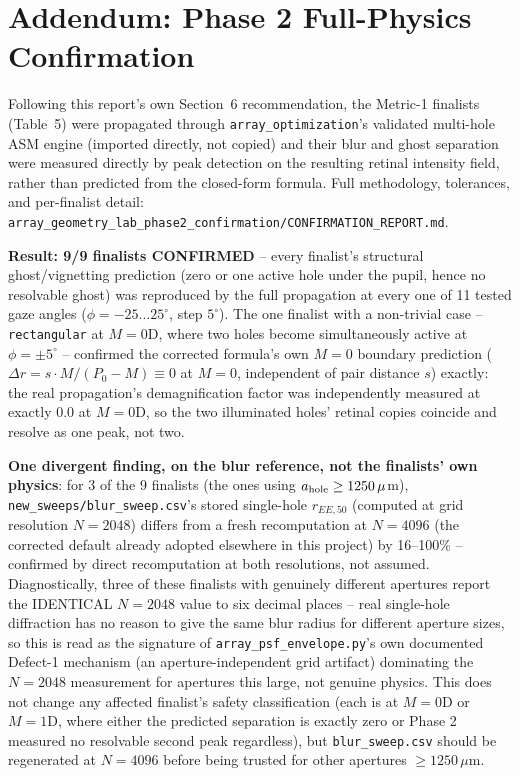 \section{Addendum: Phase 2 Full-Physics Confirmation}
Following this report's own Section~6 recommendation, the Metric-1 finalists (Table~5) were propagated through \texttt{array\_optimization}'s validated multi-hole ASM engine (imported directly, not copied) and their blur and ghost separation were measured directly by peak detection on the resulting retinal intensity field, rather than predicted from the closed-form formula. Full methodology, tolerances, and per-finalist detail: \texttt{array\_geometry\_lab\_phase2\_confirmation/CONFIRMATION\_REPORT.md}.

\textbf{Result: 9/9 finalists CONFIRMED} -- every finalist's structural ghost/vignetting prediction (zero or one active hole under the pupil, hence no resolvable ghost) was reproduced by the full propagation at every one of 11 tested gaze angles ($\phi=-25\ldots25^\circ$, step $5^\circ$). The one finalist with a non-trivial case -- \texttt{rectangular} at $M=0$D, where two holes become simultaneously active at $\phi=\pm5^\circ$ -- confirmed the corrected formula's own $M=0$ boundary prediction ($\Delta r = s \cdot M/(P_0-M) \equiv 0$ at $M=0$, independent of pair distance $s$) exactly: the real propagation's demagnification factor was independently measured at exactly $0.0$ at $M=0$D, so the two illuminated holes' retinal copies coincide and resolve as one peak, not two.

\textbf{One divergent finding, on the blur reference, not the finalists' own physics}: for 3 of the 9 finalists (the ones using $a_{\rm hole}\geq1250\,\mu$m), \texttt{new\_sweeps/blur\_sweep.csv}'s stored single-hole $r_{EE,50}$ (computed at grid resolution $N=2048$) differs from a fresh recomputation at $N=4096$ (the corrected default already adopted elsewhere in this project) by 16--100\% -- confirmed by direct recomputation at both resolutions, not assumed. Diagnostically, three of these finalists with genuinely different apertures report the IDENTICAL $N=2048$ value to six decimal places -- real single-hole diffraction has no reason to give the same blur radius for different aperture sizes, so this is read as the signature of \texttt{array\_psf\_envelope.py}'s own documented Defect-1 mechanism (an aperture-independent grid artifact) dominating the $N=2048$ measurement for apertures this large, not genuine physics. This does not change any affected finalist's safety classification (each is at $M=0$D or $M=1$D, where either the predicted separation is exactly zero or Phase 2 measured no resolvable second peak regardless), but \texttt{blur\_sweep.csv} should be regenerated at $N=4096$ before being trusted for other apertures $\geq1250\,\mu$m.

